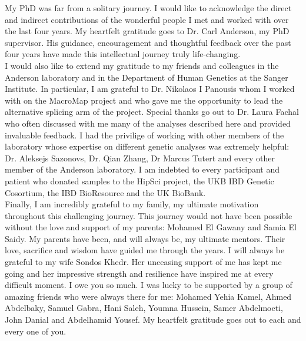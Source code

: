 
\begin{acknowledgements}      


My PhD was far from a solitary journey. I would like to acknowledge the direct and indirect contributions of the wonderful people I met and worked with over the last four years. My heartfelt gratitude goes to Dr. Carl Anderson, my PhD supervisor. His guidance, encouragement and thoughtful feedback over the past four years have made this intellectual journey truly life-changing.\\ %

I would also like to extend my gratitude to my friends and colleagues in the Anderson laboratory and in the Department of Human Genetics at the Sanger Institute. In particular, I am grateful to Dr. Nikolaos I Panousis whom I worked with on the MacroMap project and who gave me the opportunity to lead the alternative splicing arm of the project. Special thanks go out to Dr. Laura Fachal who often discussed with me many of the analyses described here and provided invaluable feedback. I had the privilige of working with other members of the laboratory whose expertise on different genetic analyses was extremely helpful: Dr. Aleksejs Sazonovs, Dr. Qian Zhang, Dr Marcus Tutert and every other member of the Anderson laboratory. I am indebted to every participant and patient who donated samples to the HipSci project, the UKB IBD Genetic Cosortium, the IBD BioResource and the UK BioBank.\\

Finally, I am incredibly grateful to my family, my ultimate motivation throughout this challenging journey. This journey would not have been possible without the love and support of my parents: Mohamed El Gawany and Samia El Saidy. My parents have been, and will always be, my ultimate mentors. Their love, sacrifice and wisdom have guided me through the years. I will always be grateful to my wife Sondos Khedr. Her unceasing support of me has kept me going and her impressive strength and resilience have inspired me at every difficult moment. I owe you so much. I was lucky to be supported by a group of amazing friends who were always there for me: Mohamed Yehia Kamel, Ahmed Abdelbaky, Samuel Gabra, Hani Saleh, Youmna Hussein, Samer Abdelmoeti, John Danial and Abdelhamid Yousef. My heartfelt gratitude goes out to each and every one of you. 


\end{acknowledgements}
